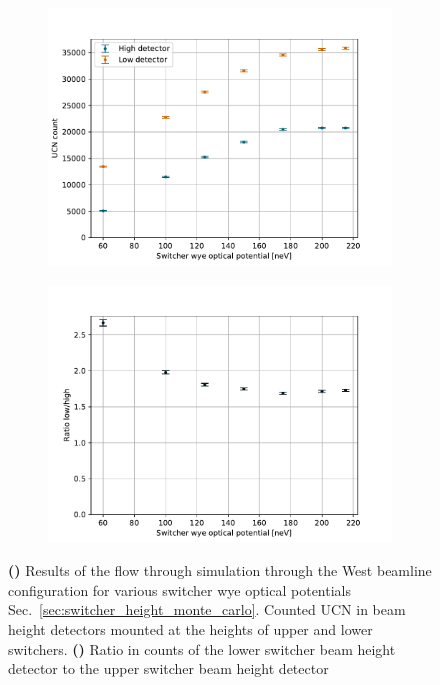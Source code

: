 \begin{figure}
\centering
\begin{subfigure}{.5\textwidth} 
  \centering
  \includegraphics[width=\textwidth]{figures/fermi_sweep_y_counts.pdf}
  \caption{}\label{subfig:y_fermi_sweep_counts}
\end{subfigure}%
\begin{subfigure}{.5\textwidth}
  \centering
  \includegraphics[width=\textwidth]{figures/fermi_sweep_y_ratio.pdf}
  \caption{}\label{subfig:y_fermi_sweep_ratio}
\end{subfigure}
\caption
{\textbf{()} Results of the flow through simulation through the West beamline configuration for various switcher wye optical potentials Sec.~\ref{sec:switcher_height_monte_carlo}. Counted UCN in beam height detectors mounted at the heights of upper and lower switchers. \textbf{()} Ratio in counts of the lower switcher beam height detector to the upper switcher beam height detector}
\label{fig:y_fermi_sweep_ratio_pentrack}
\end{figure}


